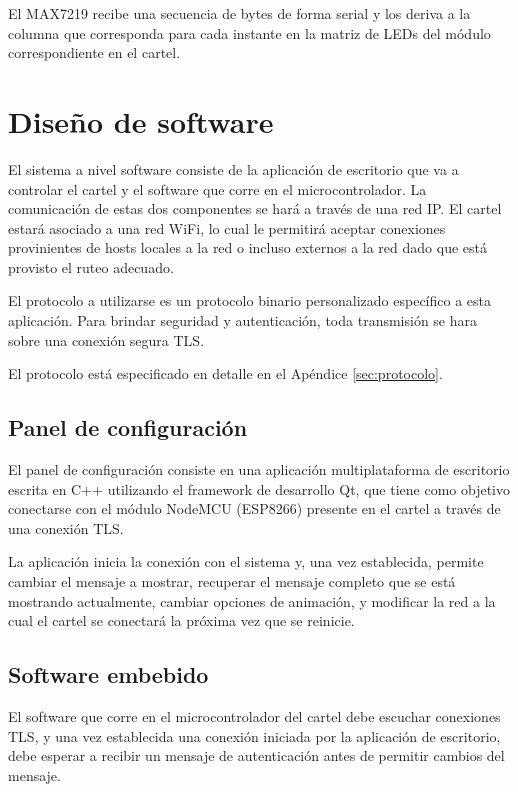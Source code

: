 El MAX7219 recibe una secuencia de bytes de forma serial y los deriva a la columna que corresponda para cada instante en la matriz de LEDs del módulo correspondiente en el cartel. 

\section{Diseño de software}
El sistema a nivel software consiste de la aplicación de escritorio que va a controlar el cartel y el software que corre en el microcontrolador.
La comunicación de estas dos componentes se hará a través de una red IP. El cartel estará asociado a una red WiFi, lo cual le permitirá aceptar conexiones provinientes de hosts locales a la red o incluso externos a la red dado que está provisto el ruteo adecuado. 

El protocolo a utilizarse es un protocolo binario personalizado específico a esta aplicación. Para brindar seguridad y autenticación, toda transmisión se hara sobre una conexión segura TLS. 

El protocolo está especificado en detalle en el Apéndice \ref{sec:protocolo}.


\subsection{Panel de configuración}
El panel de configuración consiste en una aplicación multiplataforma de escritorio escrita en C++ utilizando el framework de desarrollo Qt, que tiene como objetivo conectarse con el módulo NodeMCU (ESP8266) presente en el cartel a través de una conexión TLS.

La aplicación inicia la conexión con el sistema y, una vez establecida, permite cambiar el mensaje a mostrar, recuperar el mensaje completo que se está mostrando actualmente, cambiar opciones de animación, y modificar la red a la cual el cartel se conectará la próxima vez que se reinicie.

\subsection{Software embebido}
El software que corre en el microcontrolador del cartel debe escuchar conexiones TLS, y una vez establecida una conexión iniciada por la aplicación de escritorio, debe esperar a recibir un mensaje de autenticación antes de permitir cambios del mensaje.

